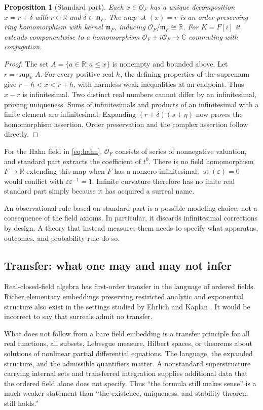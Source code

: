 \documentclass[11pt,a4paper]{article}
\numberwithin{equation}{section}
\newtheorem{proposition}[theorem]{Proposition}
\theoremstyle{definition}
\theoremstyle{remark}
\newcommand{\R}{\mathbb R}
\newcommand{\C}{\mathbb C}
\newcommand{\OO}{\mathcal O}
\newcommand{\mm}{\mathfrak m}
\newcommand{\st}{\operatorname{st}}
\begin{document}
\begin{proposition}[Standard part]\label{prop:st}
Each $x\in\OO_F$ has a unique decomposition $x=r+\delta$ with $r\in\R$ and
$\delta\in\mm_F$. The map $\st(x)=r$ is an order-preserving ring homomorphism
with kernel $\mm_F$, inducing $\OO_F/\mm_F\cong\R$.
For $K=F[i]$ it extends componentwise to a homomorphism
$\OO_F+i\OO_F\to\C$ commuting with conjugation.
\end{proposition}
\begin{proof}
The set $A=\{a\in\R:a\le x\}$ is nonempty and bounded above. Let
$r=\sup_\R A$. For every positive real $h$, the defining properties of the
supremum give $r-h<x<r+h$, with harmless weak inequalities at an endpoint.
Thus $x-r$ is infinitesimal. Two distinct real numbers cannot differ by an
infinitesimal, proving uniqueness. Sums of infinitesimals and products of an
infinitesimal with a finite element are infinitesimal. Expanding
$(r+\delta)(s+\eta)$ now proves the homomorphism assertion. Order preservation
and the complex assertion follow directly.
\end{proof}

For the Hahn field in \eqref{eq:hahn}, $\OO_F$ consists of series of
nonnegative valuation, and standard part extracts the coefficient of $t^0$.
There is no field homomorphism $F\to\R$ extending this map when $F$ has a
nonzero infinitesimal: $\st(\varepsilon)=0$ would conflict with
$\varepsilon\varepsilon^{-1}=1$. Infinite curvature therefore has no finite
real standard part simply because it has acquired a surreal name.

An observational rule based on standard part is a possible modeling choice,
not a consequence of the field axioms. In particular, it discards infinitesimal
corrections by design. A theory that instead measures them needs to specify what
apparatus, outcomes, and probability rule do so.

\subsection{Transfer: what one may and may not infer}
Real-closed-field algebra has first-order transfer in the language of ordered
fields. Richer elementary embeddings preserving restricted analytic and
exponential structure also exist in the settings studied by Ehrlich and Kaplan
\cite{EK}. It would be incorrect to say that surreals admit no transfer.

What does not follow from a bare field embedding is a transfer principle for all
real functions, all subsets, Lebesgue measure, Hilbert spaces, or theorems about
solutions of nonlinear partial differential equations. The language, the
expanded structure, and the admissible quantifiers matter. A nonstandard
superstructure carrying internal sets and transferred integration supplies
additional data that the ordered field alone does not specify. Thus ``the
formula still makes sense'' is a much weaker statement than ``the existence,
uniqueness, and stability theorem still holds.''
\end{document}
